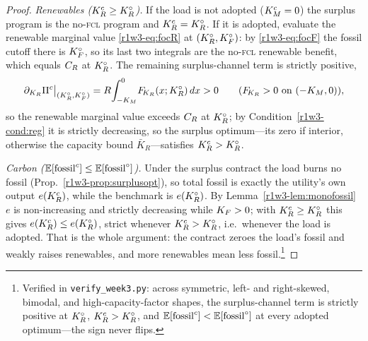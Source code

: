 \begin{proof}
\emph{Renewables ($K_R^{c}\ge K_R^{\circ}$).} If the load is not adopted ($K_M^{c}=0$) the surplus
program is the no-\textsc{fcl} program and $K_R^{c}=K_R^{\circ}$. If it is adopted, evaluate the
renewable marginal value \eqref{r1w3-eq:focR} at $(K_R^{\circ},K_F^{\circ})$: by \eqref{r1w3-eq:focF} the fossil
cutoff there is $K_F^{\circ}$, so its last two integrals are the no-\textsc{fcl} renewable
benefit, which equals $C_R$ at $K_R^{\circ}$. The remaining surplus-channel term is strictly
positive,
\[
  \partial_{K_R}\Pi^{c}\big|_{(K_R^{\circ},K_F^{\circ})}=R\!\int_{-K_M}^{0}\!F_{\!K_R}(x;K_R^{\circ})\,dx>0
  \qquad(F_{\!K_R}>0\text{ on }(-K_M,0)),
\]
so the renewable marginal value exceeds $C_R$ at $K_R^{\circ}$; by Condition~\ref{r1w3-cond:reg} it
is strictly decreasing, so the surplus optimum---its zero if interior, otherwise the
capacity bound $\bar K_R$---satisfies $K_R^{c}>K_R^{\circ}$.

\emph{Carbon ($\mathbb{E}[\mathrm{fossil}^{c}]\le\mathbb{E}[\mathrm{fossil}^{\circ}]$).} Under the surplus contract the
load burns no fossil (Prop.~\ref{r1w3-prop:surplusopt}), so total fossil is exactly the
utility's own output $e(K_R^{c})$, while the benchmark is $e(K_R^{\circ})$. By
Lemma~\ref{r1w3-lem:monofossil} $e$ is non-increasing and strictly decreasing while $K_F>0$;
with $K_R^{c}\ge K_R^{\circ}$ this gives $e(K_R^{c})\le e(K_R^{\circ})$, strict whenever $K_R^{c}>K_R^{\circ}$, i.e.\
whenever the load is adopted. That is the whole argument: the contract zeroes the load's
fossil and weakly raises renewables, and more renewables mean less fossil.\footnote{Verified
in \texttt{verify\_week3.py}: across symmetric, left- and right-skewed, bimodal, and
high-capacity-factor shapes, the surplus-channel term is strictly positive at $K_R^{\circ}$,
$K_R^{c}>K_R^{\circ}$, and $\mathbb{E}[\mathrm{fossil}^{c}]<\mathbb{E}[\mathrm{fossil}^{\circ}]$ at every adopted optimum---the sign
never flips.}
\end{proof}

